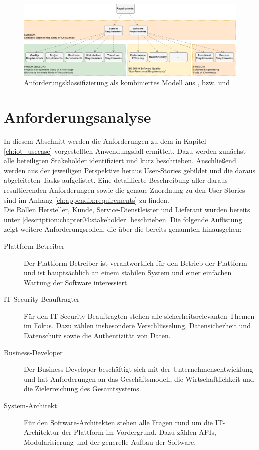 \begin{figure}[htbp]
 \centering
 \includegraphics[width=1.0\textwidth]{gfx/Requirements_Hierarchy.png}
 \caption{Anforderungsklassifizierung als kombiniertes Modell aus \cite{SWEBOK}, \cite{PMBOK} bzw. \cite{BABOK} und \cite{ISO25010}}
 \label{fig:chapter05:requirements_hierarchy}
\end{figure}

%
%
\section{Anforderungsanalyse}
\label{sec:requirements:analysis}
In diesem Abschnitt werden die Anforderungen zu dem in Kapitel \ref{ch:iot_usecase} vorgestellten Anwendungsfall ermittelt. Dazu werden zunächst alle beteiligten Stakeholder identifiziert und kurz beschrieben. Anschließend werden aus der jeweiligen Perspektive heraus User-Stories gebildet und die daraus abgeleiteten Tasks aufgelistet. Eine detaillierte Beschreibung aller daraus resultierenden Anforderungen sowie die genaue Zuordnung zu den User-Stories sind im Anhang \ref{ch:appendix:requirements} zu finden.\\

Die Rollen Hersteller, Kunde, Service-Dienstleister und Lieferant wurden bereits unter \ref{description:chapter04:stakeholder} beschrieben. Die folgende Auflistung zeigt weitere Anforderungsrollen, die über die bereits genannten hinausgehen:
\begin{description}
  \item[Plattform-Betreiber] Der Plattform-Betreiber ist verantwortlich für den Betrieb der Plattform und ist hauptsächlich an einem stabilen System und einer einfachen Wartung der Software interessiert.
  \item[IT-Security-Beauftragter] Für den IT-Security-Beauftragten stehen alle sicherheitsrelevanten Themen im Fokus. Dazu zählen insbesondere Verschlüsselung, Datensicherheit und Datenschutz sowie die Authentizität von Daten.
  \item[Business-Developer] Der Business-Developer beschäftigt sich mit der Unternehmensentwicklung und hat Anforderungen an das Geschäftsmodell, die Wirtschaftlichkeit und die Zielerreichung des Gesamtsystems.
  \item[System-Architekt] Für den Software-Architekten stehen alle Fragen rund um die IT-Architektur der Plattform im Vordergrund. Dazu zählen \ac{API}s, Modularisierung und der generelle Aufbau der Software.
\end{description}

